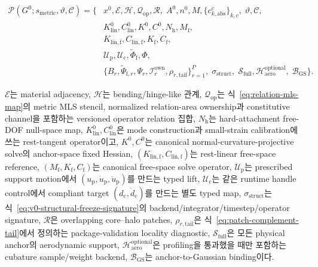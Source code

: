 \documentclass[11pt,a4paper]{article}
\begin{document}
\begin{equation}
\begin{aligned}
  \mathcal P(G^0;s_{\mathrm{metric}},\vartheta,\mathcal C)=\{&
  x^0,\mathcal E,\mathcal H,\mathcal Q_{\mathrm{op}},\mathcal R,\;
  A^0,n^0,M,\{c_{k,\mathrm{abs}}^c\}_{k,c},\;
  \vartheta,\mathcal C,\\
  &K_{\mathrm{lin}}^0,C_{\mathrm{lin}}^0,K^0,C^0,N_{\mathrm h},M_{\mathrm f},\\
  &K_{\mathrm{lin,f}},C_{\mathrm{lin,f}},K_{\mathrm f},C_{\mathrm f},\\
  &\mathcal U_{\mathrm p},\mathcal U_{\mathrm c},
  \widetilde\Phi_{\mathrm f},\Phi,\\
  &\{B_r,\widetilde\Psi_{\mathrm f,r},\Psi_r,\mathcal I_r^{\mathrm{own}},
  \rho_{r,\mathrm{tail}}\}_{r=1}^{P},\;
  \sigma_{\mathrm{struct}},\;
  \mathcal S_{\mathrm{full}},\mathcal H_{\mathrm{aero}}^{\mathrm{optional}},\;
  \mathcal B_{\mathrm{GS}}
  \}.
\end{aligned}
\end{equation}

\(\mathcal E\)는 material adjacency,
\(\mathcal H\)는 bending/hinge-like 관계,
\(\mathcal Q_{\mathrm{op}}\)는 식~\eqref{eq:relation-mls-map}의
metric MLS stencil, normalized relation-area ownership과 constitutive channel을 포함하는
versioned operator relation 집합,
\(N_{\mathrm h}\)는 hard-attachment free-DOF null-space map,
\(K_{\mathrm{lin}}^0,C_{\mathrm{lin}}^0\)은 mode construction과 small-strain calibration에 쓰는
rest-tangent operator이고, \(K^0,C^0\)는 canonical normal-curvature-projective solve의
anchor-space fixed Hessian,
\((K_{\mathrm{lin,f}},C_{\mathrm{lin,f}})\)는 rest-linear free-space reference,
\((M_{\mathrm f},K_{\mathrm f},C_{\mathrm f})\)는 canonical free-space solve operator,
\(\mathcal U_{\mathrm p}\)는 prescribed support motion에서
\((u_{\mathrm p},\dot u_{\mathrm p},\ddot u_{\mathrm p})\)를 만드는 typed lift,
\(\mathcal U_{\mathrm c}\)는 같은 runtime handle control에서 compliant target
\((d_{\mathrm c},\dot d_{\mathrm c})\)를 만드는 별도 typed map,
\(\sigma_{\mathrm{struct}}\)는 식~\eqref{eq:v0-structural-freeze-signature}의
backend/integrator/timestep/operator signature,
\(\mathcal R\)은 overlapping core--halo patches,
\(\rho_{r,\mathrm{tail}}\)은 식~\eqref{eq:patch-complement-tail}에서 정의하는
package-validation locality diagnostic,
\(\mathcal S_{\mathrm{full}}\)은 모든 physical anchor의 aerodynamic support,
\(\mathcal H_{\mathrm{aero}}^{\mathrm{optional}}\)은 profiling을 통과했을 때만 포함하는
cubature sample/weight backend,
\(\mathcal B_{\mathrm{GS}}\)는 anchor-to-Gaussian binding이다.
\end{document}
